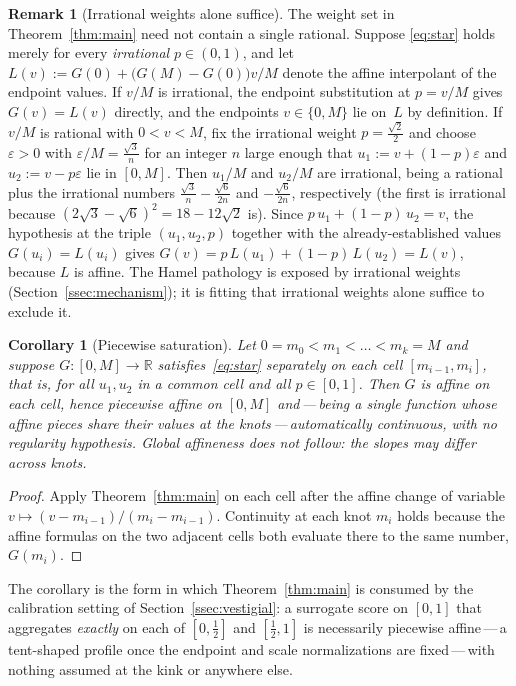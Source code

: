 \documentclass{article}
\theoremstyle{plain}
\newtheorem{corollary}[theorem]{Corollary}
\theoremstyle{definition}
\newtheorem{remark}[theorem]{Remark}
\newcommand{\R}{\mathbb{R}}
\begin{document}
\begin{remark}[Irrational weights alone suffice]\label{rem:irrational}
The weight set in Theorem~\ref{thm:main} need not contain a single
rational. Suppose \eqref{eq:star} holds merely for every
\emph{irrational} $p\in(0,1)$, and let
$L(v):=G(0)+\bigl(G(M)-G(0)\bigr)v/M$ denote the affine interpolant of
the endpoint values. If $v/M$ is irrational, the endpoint substitution
at $p=v/M$ gives $G(v)=L(v)$ directly, and the endpoints $v\in\{0,M\}$
lie on~$L$ by definition. If $v/M$ is rational with
$0<v<M$, fix the irrational weight $p=\tfrac{\sqrt2}{2}$ and choose
$\varepsilon>0$ with $\varepsilon/M=\tfrac{\sqrt3}{n}$ for an integer
$n$ large enough that $u_1:=v+(1-p)\varepsilon$ and
$u_2:=v-p\varepsilon$ lie in $[0,M]$. Then $u_1/M$ and $u_2/M$ are
irrational, being a rational plus the irrational numbers
$\tfrac{\sqrt3}{n}-\tfrac{\sqrt6}{2n}$ and $-\tfrac{\sqrt6}{2n}$,
respectively (the first is irrational because
$(2\sqrt3-\sqrt6)^2=18-12\sqrt2$ is). Since $p\,u_1+(1-p)\,u_2=v$, the hypothesis at the
triple $(u_1,u_2,p)$ together with the already-established values
$G(u_i)=L(u_i)$ gives $G(v)=p\,L(u_1)+(1-p)\,L(u_2)=L(v)$, because $L$
is affine. The Hamel pathology is exposed by irrational weights
(Section~\ref{ssec:mechanism}); it is fitting that irrational weights
alone suffice to exclude it.
\end{remark}

\begin{corollary}[Piecewise saturation]\label{cor:piecewise}
Let $0=m_0<m_1<\dots<m_k=M$ and suppose $G\colon[0,M]\to\R$
satisfies~\eqref{eq:star} separately on each cell $[m_{i-1},m_i]$,
that is, for all $u_1,u_2$ in a common cell and all $p\in[0,1]$. Then
$G$ is affine on each cell, hence piecewise affine on $[0,M]$
and\,---\,being a single function whose affine pieces share their
values at the knots\,---\,automatically continuous, with no
regularity hypothesis. Global affineness does not follow: the slopes
may differ across knots.
\end{corollary}

\begin{proof}
Apply Theorem~\ref{thm:main} on each cell after the affine change of
variable $v\mapsto(v-m_{i-1})/(m_i-m_{i-1})$. Continuity at each knot
$m_i$ holds because the affine formulas on the two adjacent cells both
evaluate there to the same number, $G(m_i)$.
\end{proof}

\noindent The corollary is the form in which Theorem~\ref{thm:main}
is consumed by the calibration setting of
Section~\ref{ssec:vestigial}: a surrogate score on $[0,1]$ that
aggregates \emph{exactly} on each of $[0,\tfrac12]$ and $[\tfrac12,1]$
is necessarily piecewise affine\,---\,a tent-shaped profile once the endpoint and scale normalizations are fixed\,---\,with
nothing assumed at the kink or anywhere else.
\end{document}

